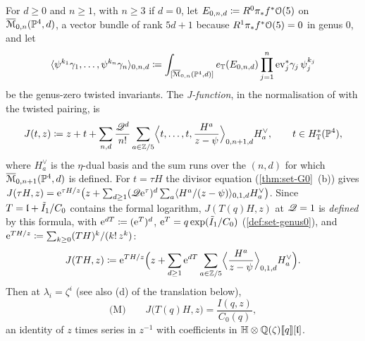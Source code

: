 \begin{thm}
\label{thm:set-mirror}
For $d\geq0$ and $n\geq1$, with $n\geq3$ if $d=0$, let $E_{0,n,d}\coloneqq R^0\pi_*f^*\mathcal{O}(5)$ on $\overline{\mathcal M}_{0,n}(\mathbb{P}^4,d)$, a vector bundle of rank $5d+1$ because $R^1\pi_*f^*\mathcal{O}(5)=0$ in genus $0$, and let
\[
\langle\psi^{k_1}\gamma_1,\dots,\psi^{k_n}\gamma_n\rangle_{0,n,d}\coloneqq\int_{[\overline{\mathcal M}_{0,n}(\mathbb{P}^4,d)]}e_{\mathbb{T}}(E_{0,n,d})\prod_{j=1}^n\mathrm{ev}_j^*\gamma_j\,\psi_j^{k_j}
\]
be the genus-zero twisted invariants. The \emph{J-function}, in the normalisation of \cite[Section~6, (10)]{MR2276766} with the twisted pairing, is
\[
J(t,z)\coloneqq z+t+\sum_{n,d}\frac{\mathscr{Q}^d}{n!}\sum_{a\in\mathbb{Z}/5}\Bigl\langle t,\dots,t,\frac{H^a}{z-\psi}\Bigr\rangle_{0,n+1,d}H^\vee_a,\qquad t\in H^*_{\mathbb{T}}(\mathbb{P}^4),
\]
where $H^\vee_a$ is the $\eta$-dual basis and the sum runs over the $(n,d)$ for which $\overline{\mathcal M}_{0,n+1}(\mathbb{P}^4,d)$ is defined. For $t=\tau H$ the divisor equation (\cref{thm:set-G0}~(b)) gives $J(\tau H,z)=\mathrm{e}^{\tau H/z}\bigl(z+\sum_{d\geq1}(\mathscr{Q}\mathrm{e}^{\tau})^d\sum_a\langle H^a/(z-\psi)\rangle_{0,1,d}H^\vee_a\bigr)$. Since $T=\mathfrak{l}+\tilde I_1/C_0$ contains the formal logarithm, $J(T(q)H,z)$ at $\mathscr{Q}=1$ is \emph{defined} by this formula, with $\mathrm{e}^{dT}\coloneqq(\mathrm{e}^T)^d$, $\mathrm{e}^T=q\exp(\tilde I_1/C_0)$ (\cref{def:set-genus0}), and $\mathrm{e}^{TH/z}\coloneqq\sum_{k\geq0}(TH)^k/(k!\,z^k)$:
\[
J(TH,z)\coloneqq\mathrm{e}^{TH/z}\Bigl(z+\sum_{d\geq1}\mathrm{e}^{dT}\sum_{a\in\mathbb{Z}/5}\Bigl\langle\frac{H^a}{z-\psi}\Bigr\rangle_{0,1,d}H^\vee_a\Bigr).
\]
Then at $\lambda_i=\zeta^i$ (see also (d) of the translation below),
\[
\text{(M)}\qquad J\bigl(T(q)H,z\bigr)=\frac{I(q,z)}{C_0(q)},
\]
an identity of $z$ times series in $z^{-1}$ with coefficients in $\mathbb{H}\otimes\mathbb{Q}(\zeta)[\![ q ]\!][\mathfrak{l}]$.
\end{thm}

